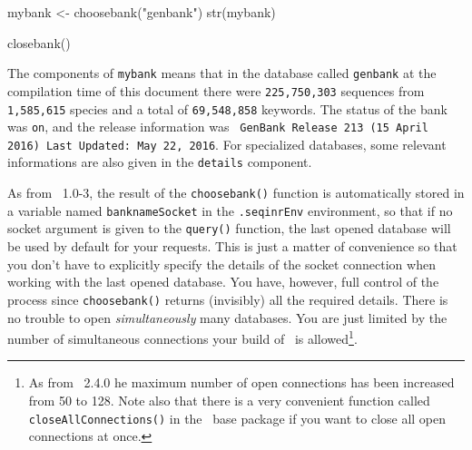 \documentclass{article}
\begin{document}
\begin{Schunk}
\begin{Sinput}
 mybank <- choosebank("genbank")
 str(mybank)
\end{Sinput}
\begin{Sinput}
 closebank()
\end{Sinput}
\end{Schunk}

The components of \texttt{mybank} means that in the database
called \texttt{genbank} at the compilation time
of this document there were 
\texttt{225,750,303}
sequences from
\texttt{1,585,615}
species and a total of
\texttt{69,548,858}
keywords. The status of the bank was
\texttt{on}, 
and the release information was
\texttt{         GenBank Release 213 (15 April 2016) Last Updated: May 22, 2016}.
For specialized databases, some relevant informations are also given in the
\texttt{details} component.

As from \seqinr~1.0-3, the result of the \texttt{choosebank()} function is automatically
stored in a variable named \texttt{banknameSocket} in the \texttt{.seqinrEnv}
environment, so that if no socket argument
is given to the \texttt{query()} function, the last opened database will be used by default
for your requests.
This is just a matter of convenience so that you don't have to explicitly specify the details of the
socket connection when working with the last opened database. You have, however,
full control of the process since \texttt{choosebank()} returns (invisibly) all the
required details. There is no trouble to open \emph{simultaneously} many databases.
You are just limited by the number of simultaneous connections your build of \Rlogo{}~is
allowed\footnote{%
As from \Rlogo{}~2.4.0 he maximum number of open connections has been increased from
50 to 128. Note also that 
there is a very convenient function called \texttt{closeAllConnections()} in the \Rlogo{}~base package if
you want to close all open connections at once.}.
\end{document}
